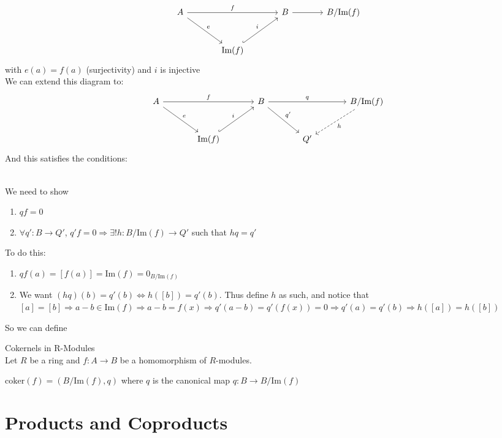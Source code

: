 \documentclass{report}
\begin{document}
    \[
\begin{tikzcd}[row sep=large, column sep=large]
A \arrow[rr, "f"] \arrow[dr, "e"] & & B \arrow[r] & B/\text{Im}(f) \\ & \text{Im}(f) \arrow[ur, hook, "i"]
\end{tikzcd}
\]
with $e(a)=f(a)$ (surjectivity) and $i$ is injective
~\\ We can extend this diagram to:
    \[
\begin{tikzcd}[row sep=large, column sep=large]
A \arrow[rr, "f"] \arrow[dr, "e"] & & B \arrow[rr, "q"] \arrow[dr, "q'"] & & B/\text{Im}(f) \arrow[dl, dashed, "h"] \\ & \text{Im}(f) \arrow[ur, hook, "i"] & & Q'
\end{tikzcd}
\]
And this satisfies the conditions:
\begin{prf}{}{}\\
    We need to show
    \begin{enumerate}
        \item $qf = 0$
        \item $\forall q':B \to Q'$, $q'f=0 \Rightarrow \exists !h:B/\text{Im}(f) \to Q'$ such that $hq=q'$
    \end{enumerate}
    To do this:
    \begin{enumerate}
        \item $qf(a) = [f(a)] = \text{Im}(f) = 0_{B/\text{Im}(f)}$
        \item We want $(hq)(b) = q'(b) \iff h([b])=q'(b)$. Thus define $h$ as such, and notice that $[a]=[b] \Rightarrow a-b \in \text{Im}(f) \Rightarrow a-b=f(x) \Rightarrow q'(a-b)=q'(f(x))=0 \Rightarrow q'(a)=q'(b) \Rightarrow h([a])=h([b])$
    \end{enumerate}
\end{prf}
So we can define
\begin{definition}{Cokernels in R-Modules}{} \\
Let $R$ be a ring and $f: A \to B$ be a homomorphism of $R$-modules. 
\begin{center}
    $\text{coker}(f)=(B/\text{Im}(f), q)$ where $q$ is the canonical map $q:B \to B/ \text{Im}(f)$
\end{center}
\end{definition}


\newpage
\section{Products and Coproducts}
\end{document}
